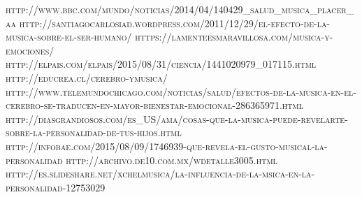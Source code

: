 \documentclass{bmcart}
\begin{document}
\begin{backmatter}
\newpage
\renewcommand{\refname}{Referencias}\begin{thebibliography}{X}
	 \textsc{http://www.bbc.com/mundo/noticias/2014/04/140429\_salud\_musica\_placer\_aa}
	 \textsc{http://santiagocarlosiad.wordpress.com/2011/12/29/el-efecto-de-la-musica-sobre-el-ser-humano/}
	 \textsc{https://lamenteesmaravillosa.com/musica-y-emociones/}
	 \textsc{http://elpais.com/elpais/2015/08/31/ciencia/1441020979\_017115.html}
	 \textsc{http://educrea.cl/cerebro-ymusica/}
	 \textsc{http://www.telemundochicago.com/noticias/salud/efectos-de-la-musica-en-el-cerebro-se-traducen-en-mayor-bienestar-emocional-286365971.html}
	 \textsc{http://diasgrandiosos.com/es\_US/ama/cosas-que-la-musica-puede-revelarte-sobre-la-personalidad-de-tus-hijos.html}
	 \textsc{http://infobae.com/2015/08/09/1746939-que-revela-el-gusto-musical-la-personalidad}
	 \textsc{http://archivo.de10.com.mx/wdetalle3005.html}
	 \textsc{http://es.slideshare.net/xchelmusica/la-influencia-de-la-msica-en-la-personalidad-12753029}
\end{thebibliography}








\end{backmatter}
\end{document}
